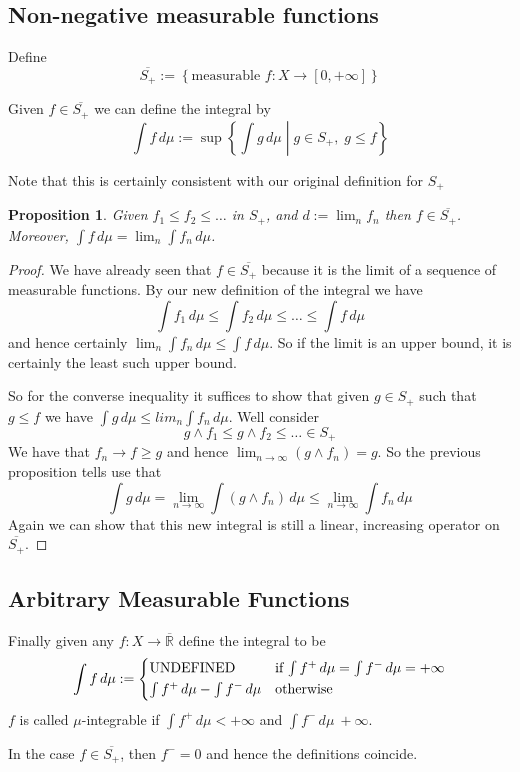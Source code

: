 \documentclass[11pt]{article}
\newcommand{\defeq}{:=}
\newcommand{\relmiddle}[1]{\mathrel{}\middle#1\mathrel{}}
\newcommand{\rmv}{\relmiddle|}
\newcommand{\dm}{\ensuremath{\,d\mu}}
\newcommand{\R}{\mathbb{R}}
\newcommand{\Rb}{\overline{\R}}
\newenvironment{defin}
	{\begin{mdframed}[backgroundcolor=white, roundcorner=5pt, linewidth=1pt]}
	{\end{mdframed}}
\newcommand{\mdf}[1]{{\color{red} #1}}
\newtheorem{prop}[theorem]{Proposition}
\begin{document}
\subsection{Non-negative measurable functions}
Define
\[
	\overline{S_+}\defeq\left\{\text{measurable }f:X\to[0, +\infty]\right\}
\]
\begin{defin}
Given $f\in\overline{S_+}$ we can define the \mdf{integral} by
\[
	\int f \dm\defeq \sup\left\{\int g \dm \rmv g\in S_+, \; g\leq f\right\}
\]
\end{defin}
Note that this is certainly consistent with our original definition for $S_+$
\begin{prop}
	Given $f_1 \leq f_2 \leq \dots$ in $S_+$, and $d\defeq\lim_n f_n$ then $f\in \overline{S_+}$.
	Moreover, $\int f \dm = \lim_n \int f_n \dm$.
\end{prop}
\begin{proof}
We have already seen that $f\in\overline{S_+}$ because it is the limit of a sequence of measurable functions.
By our new definition of the integral we have
\[
\int f_1 \dm \leq \int f_2 \dm \leq \dots \leq \int f \dm
\]
and hence certainly $\lim_n \int f_n \dm \leq \int f \dm$.
So if the limit is an upper bound, it is certainly the least such upper bound.

So for the converse inequality it suffices to show that given $g\in S_+$ such that $g\leq f$ we have $\int g \dm \leq lim_n \int f_n \dm$.
Well consider 
\[
g\wedge f_1 \leq g\wedge f_2 \leq \dots \in S_+
\]
We have that $f_n\to f\geq g$ and hence $\lim_{n\to\infty}(g\wedge f_n)= g$.
So the previous proposition tells use that
\[
	\int g \dm = \lim_{n\to\infty}\int (g\wedge f_n) \dm \leq \lim_{n\to\infty}\int f_n \dm 
\]
Again we can show that this new integral is still a linear, increasing operator on $\overline{S_+}$.
\end{proof}

\subsection{Arbitrary Measurable Functions}
\begin{defin}
	Finally given any $f:X\to\Rb$ define the \mdf{integral} to be
\[
	\int f\dm\defeq
	\begin{cases*}
		\text{UNDEFINED} & if $\int f^+ \dm = \int f^- \dm = +\infty$\\
		\int f^+ \dm - \int f^- \dm & otherwise
	\end{cases*}
\]
$f$ is called \mdf{$\mu$-integrable} if $\int f^+ \dm < +\infty$ and $\int f^- \dm \ + \infty$.
\end{defin}  
In the case $f\in\overline{S_+}$, then $f^-=0$ and hence the definitions coincide.
\end{document}
